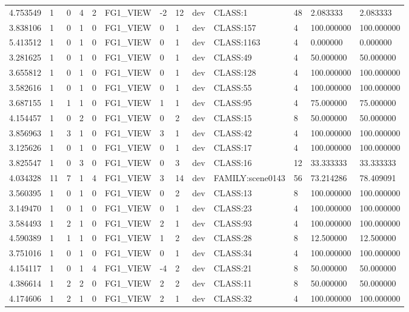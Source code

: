 \begin{tabular}{lllllllllllll}
4.753549 & 1 & 0 & 4 & 2 & FG1\_VIEW & -2 & 12 & dev & CLASS:1 & 48 & 2.083333 & 2.083333 \\
3.838106 & 1 & 0 & 1 & 0 & FG1\_VIEW & 0 & 1 & dev & CLASS:157 & 4 & 100.000000 & 100.000000 \\
5.413512 & 1 & 0 & 1 & 0 & FG1\_VIEW & 0 & 1 & dev & CLASS:1163 & 4 & 0.000000 & 0.000000 \\
3.281625 & 1 & 0 & 1 & 0 & FG1\_VIEW & 0 & 1 & dev & CLASS:49 & 4 & 50.000000 & 50.000000 \\
3.655812 & 1 & 0 & 1 & 0 & FG1\_VIEW & 0 & 1 & dev & CLASS:128 & 4 & 100.000000 & 100.000000 \\
3.582616 & 1 & 0 & 1 & 0 & FG1\_VIEW & 0 & 1 & dev & CLASS:55 & 4 & 100.000000 & 100.000000 \\
3.687155 & 1 & 1 & 1 & 0 & FG1\_VIEW & 1 & 1 & dev & CLASS:95 & 4 & 75.000000 & 75.000000 \\
4.154457 & 1 & 0 & 2 & 0 & FG1\_VIEW & 0 & 2 & dev & CLASS:15 & 8 & 50.000000 & 50.000000 \\
3.856963 & 1 & 3 & 1 & 0 & FG1\_VIEW & 3 & 1 & dev & CLASS:42 & 4 & 100.000000 & 100.000000 \\
3.125626 & 1 & 0 & 1 & 0 & FG1\_VIEW & 0 & 1 & dev & CLASS:17 & 4 & 100.000000 & 100.000000 \\
3.825547 & 1 & 0 & 3 & 0 & FG1\_VIEW & 0 & 3 & dev & CLASS:16 & 12 & 33.333333 & 33.333333 \\
4.034328 & 11 & 7 & 1 & 4 & FG1\_VIEW & 3 & 14 & dev & FAMILY:scene0143 & 56 & 73.214286 & 78.409091 \\
3.560395 & 1 & 0 & 1 & 0 & FG1\_VIEW & 0 & 2 & dev & CLASS:13 & 8 & 100.000000 & 100.000000 \\
3.149470 & 1 & 0 & 1 & 0 & FG1\_VIEW & 0 & 1 & dev & CLASS:23 & 4 & 100.000000 & 100.000000 \\
3.584493 & 1 & 2 & 1 & 0 & FG1\_VIEW & 2 & 1 & dev & CLASS:93 & 4 & 100.000000 & 100.000000 \\
4.590389 & 1 & 1 & 1 & 0 & FG1\_VIEW & 1 & 2 & dev & CLASS:28 & 8 & 12.500000 & 12.500000 \\
3.751016 & 1 & 0 & 1 & 0 & FG1\_VIEW & 0 & 1 & dev & CLASS:34 & 4 & 100.000000 & 100.000000 \\
4.154117 & 1 & 0 & 1 & 4 & FG1\_VIEW & -4 & 2 & dev & CLASS:21 & 8 & 50.000000 & 50.000000 \\
4.386614 & 1 & 2 & 2 & 0 & FG1\_VIEW & 2 & 2 & dev & CLASS:11 & 8 & 50.000000 & 50.000000 \\
4.174606 & 1 & 2 & 1 & 0 & FG1\_VIEW & 2 & 1 & dev & CLASS:32 & 4 & 100.000000 & 100.000000 \\

\end{tabular}
